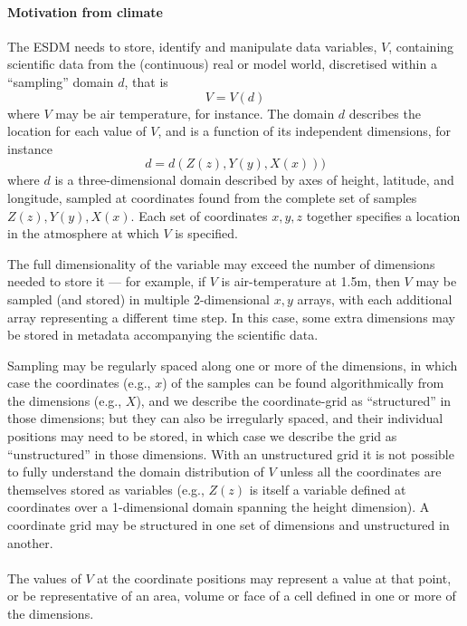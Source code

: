 \paragraph{Motivation from climate}



The ESDM needs to store, identify and manipulate data variables,  $V$, containing scientific data from the (continuous) real or model world, discretised within a ``sampling'' domain $d$, that is
\[V=V(d)\]
where $V$ may be air temperature, for instance. The domain $d$ describes the location for each value of $V$, and is a function of its independent dimensions, for instance
\[d = d(Z(z), Y(y), X(x)))\]
where $d$ is a three-dimensional domain described by axes of height, latitude, and longitude, sampled at coordinates found from the complete set of samples $Z(z),Y(y),X(x)$.
Each set of coordinates $x,y,z$  together specifies a location in the atmosphere at which $V$ is specified.



The full dimensionality of the variable may exceed the number of dimensions needed to store it --- for example, if $V$ is air-temperature at 1.5m, then $V$ may be sampled (and stored) in multiple 2-dimensional $x,y$ arrays, with each additional array representing a different time step.
In this case, some extra dimensions may be stored in metadata accompanying the scientific data.



Sampling may be regularly spaced along one or more of the dimensions, in which case the coordinates (e.g., $x$) of the samples can be found algorithmically from the dimensions (e.g., $X$), and we describe the coordinate-grid as ``structured'' in those dimensions; but they can also be irregularly spaced, and their individual positions may need to be stored, in which case we describe the grid as ``unstructured'' in those dimensions.
With an unstructured grid it is not possible to fully understand the domain distribution of $V$ unless all the coordinates are themselves stored as variables (e.g., $Z(z)$ is itself a variable defined at coordinates over a 1-dimensional domain spanning the height dimension).  A coordinate grid may be structured in one set of dimensions and unstructured in another.

\paragraph{}The values of $V$ at the coordinate positions may represent a value at that point, or be representative of an area, volume or face of a cell defined in one or more of the dimensions.

